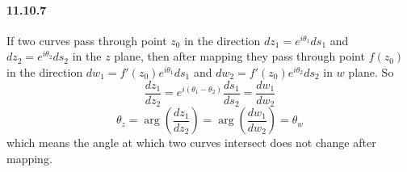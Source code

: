 \documentclass[a4paper]{article}
\begin{document}
\paragraph{11.10.7}
If two curves pass through point $z_0$ in the direction $dz_1=e^{i\theta_1}ds_1$ and $dz_2=e^{i\theta_2}ds_2$ in the $z$ plane, then after mapping they pass through point $f(z_0)$ in the direction $dw_1=f'(z_0)e^{i\theta_1}ds_1$ and $dw_2=f'(z_0)e^{i\theta_2}ds_2$ in $w$ plane. So
\[
\frac{dz_1}{dz_2}=e^{i(\theta_1-\theta_2)}\frac{ds_1}{ds_2}=\frac{dw_1}{dw_2}
\]
\[
\theta_z=\arg\left(\frac{dz_1}{dz_2}\right)=\arg\left(\frac{dw_1}{dw_2}\right)=\theta_w
\]
which means the angle at which two curves intersect does not change after mapping.
\end{document}
